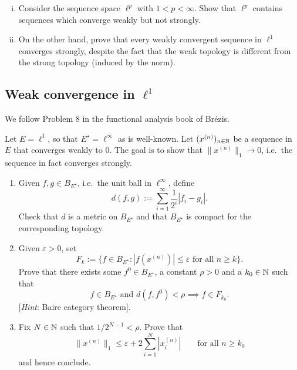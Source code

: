 \begin{exercise}[Ex.\ 5(b),(c)]
	\begin{enumerate}[(i)]
		\item Consider the sequence space $\ell^p$ with $1 < p < \infty$. Show that $\ell^p$ contains sequences which converge weakly but not strongly.
		\item On the other hand, prove that every weakly convergent sequence in $\ell^1$ converges strongly, despite the fact that the weak topology is different from the strong topology (induced by the norm).
	\end{enumerate}
\end{exercise}

\subsection*{Weak convergence in $\ell^1$}
We follow Problem 8 in the functional analysis book of Br\'{e}zis.

Let $E = \ell^1$, so that $E^\star = \ell^\infty$ as is well-known. Let $(x^{(n)})_{n\in\mathbb{N}}$ be a sequence in $E$ that converges weakly to 0. The goal is to show that $\|x^{(n)}\|_1 \to 0$, i.e.\ the sequence in fact converges strongly.

\begin{enumerate}
	\item Given $f, g \in B_{E^\star}$, i.e.\ the unit ball in $\ell^\infty$, define
	\begin{equation*}
		d(f,g) := \sum_{i=1}^\infty \frac{1}{2^i}|f_i - g_i|.
	\end{equation*}
	Check that $d$ is a metric on $B_{E^\star}$ and that $B_{E^\star}$ is compact for the corresponding topology.
	
	\item Given $\varepsilon >0$, set
	\begin{equation*}
		F_k := \{ f \in B_{E^\star} : |f(x^{(n)})| \le \varepsilon \text{ for all } n \ge k\}.
	\end{equation*}
	Prove that there exists some $f^0 \in B_{E^\star}$, a constant $\rho >0$ and a $k_0 \in\mathbb{N}$ such that
	\begin{equation*}
		f \in B_{E^\star} \text{ and } d(f,f^0) < \rho \implies f \in F_{k_0}.
	\end{equation*}
	[\emph{Hint}: Baire category theorem].
	
	\item Fix $N\in\mathbb{N}$ such that $1/2^{N-1} < \rho$. Prove that
	\begin{equation*}
		\|x^{(n)}\|_1 \le \varepsilon + 2 \sum_{i=1}^N |x_i^{(n)}| \qquad \text{for all } n \ge k_0
	\end{equation*}
	and hence conclude.
\end{enumerate}